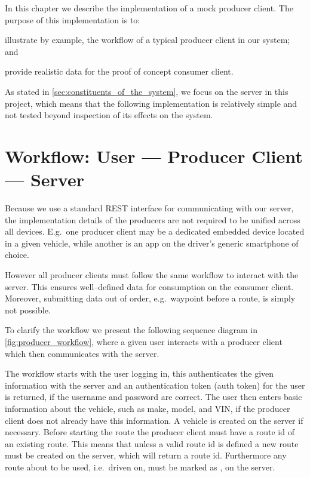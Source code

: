 In this chapter we describe the implementation of a mock producer client.
The purpose of this implementation is to:
\begin{enumberate*}
\item illustrate by example, the workflow of a typical producer client in our system; and
\item provide realistic data for the proof of concept consumer client.
\end{enumberate*}

As stated in \cref{sec:constituents_of_the_system}, we focus on the server in this project,
which means that the following implementation is relatively simple and not tested beyond inspection of its effects on the system.

\section{Workflow: User --- Producer Client --- Server}
Because we use a standard REST interface for communicating with our server, the implementation details of the producers are not required to be unified across all devices.
E.g.~one producer client may be a dedicated embedded device located in a given vehicle, while another is an app on the driver's generic smartphone of choice.

However all producer clients must follow the same workflow to interact with the server.
This ensures well--defined data for consumption on the consumer client. %
Moreover, submitting data out of order, e.g.~waypoint before a route, is simply not possible.

\bigskip
To clarify the workflow we present the following sequence diagram in \cref{fig:producer_workflow},
where a given user interacts with a producer client which then communicates with the server.

The workflow starts with the user logging in, this authenticates the given information with the server and an authentication token (auth token) for the user is returned, if the username and password are correct.
The user then enters basic information about the vehicle, such as make, model, and VIN, if the producer client does not already have this information.
A vehicle is created on the server if necessary.
Before starting the route the producer client must have a route id of an existing route.
This means that unless a valid route id is defined a new route must be created on the server, which will return a route id.
Furthermore any route about to be used, i.e.~driven on, must be marked as , on the server.

